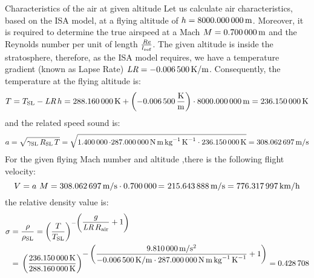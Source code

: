 \documentclass[[12pt,twoside]{book}
\begin{document}
%

%
\begin{myExampleX}{Characteristics of the air at given altitude}{}%
\label{example:Characteristics:Of:The:Air:At:A:Certain:Altitude}
%
\noindent
Let us calculate air characteristics, based on the ISA model, at a flying altitude of $h=\SI[round-precision=0]{\myAltitudeM}{m}$.
% 
Moreover, it is required to determine the true airspeed at a Mach $M=\SI[round-precision=2]{\myMachnumber}{m}$ and the Reynolds number per unit of length $\frac{\text{\itshape Re} }{l_\text{ref}}$. The given altitude is inside the stratosphere, therefore, as the ISA model requires, we have a temperature gradient (known as Lapse Rate) $\text{\itshape LR}=\SI[round-precision=4]{\myTemperaturegradient}{K/m}$.
Consequently, the temperature at the flying altitude is:
\[
T = {T_\text{SL}- \text{\itshape LR} \, h   
    = \SI[round-precision=2]{\myTemperaturesealevelK}{K}
        + \left( \SI[round-precision=4]{\myTemperaturegradient}{\frac{K}{m}} \right) \cdot\SI[round-precision=0]{\myAltitudeM}{m} } 
    = \SI[round-precision=1]{\myTemperatureK}{K}
\]
and the related speed sound is:
\[
a =\sqrt{
    \gamma_\text{SL} \, R_\text{SL} \,T}
    = \sqrt{
        \SI[round-precision=1]{\myAdiabaticindex} \cdot
        \SI[round-precision=0]{\myAirspecificconstant}{N\,m\,kg^{-1}\,K^{-1}} \cdot
        \SI[round-precision=2]{\myTemperatureK}{K}} 
    = \SI[round-precision=2]{\mySoundspeed}{m/s}
\]
\noindent
%
For the given flying Mach number and altitude ,there is the following flight velocity:
\[
 V = {a }~{M} =\SI[round-precision=2]{\mySoundspeed}{m/s} \cdot \SI[round-precision=2]{\myMachnumber}= ~\SI[round-precision=2]{\mySpeedMs}{m/s} = \SI[round-precision=2]{\mySpeedkmh}{km/h} 
 \]
the relative density value is:
\[
\begin{split}
\sigma 
    & ={} \frac{\rho}{\rho_\text{SL}} = 
    \left( \frac{T}{T_\text{SL} } \right)^{
        -\left(\displaystyle \dfrac{ g }{\textit{LR}\, R_\text{air}} + 1 \right)
        } 
    \\ 
    & ={} \left(\frac{
        \SI[round-precision=2]{\myTemperatureK}{K} 
        }{
        \SI[round-precision=2]{\myTemperaturesealevelK}{K}
        }\right)^{\displaystyle
            -\left( \dfrac{
                \SI[round-precision=2]{\myGravitationalacceleration}{m/s^2}
                }{
                \SI[round-precision=4]{\myTemperaturegradient}{K/m}
                \cdot
                \SI[round-precision=0]{\myAirspecificconstant}{N\,m\,kg^{-1}\,K^{-1}}
                }{}
            + 1 \right)
        }
        = \SI[round-precision=3]{\myRelativedensity}{}
\end{split}
\]


\end{myExampleX}
\end{document}
